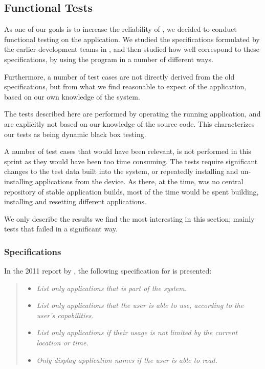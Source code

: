 \subsection{Functional Tests}\label{sec:sprint1:testing}

As one of our goals is to increase the reliability of \launcher, we decided to conduct functional testing on the application.
We studied the specifications formulated by the earlier development teams in \citet{launcher2011,launcher2012}, and then studied how well \launcher correspond to these specifications, by using the program in a number of different ways. 

Furthermore, a number of test cases are not directly derived from the old specifications, but from what we find reasonable to expect of the application, based on our own knowledge of the system.

The tests described here are performed by operating the running application, and are explicitly not based on our knowledge of the source code. 
This characterizes our tests as being dynamic black box testing. 

A number of test cases that would have been relevant, is not performed in this sprint as they would have been too time consuming. 
The tests require significant changes to the test data built into the \giraf system, or repeatedly installing and un-installing applications from the device.
As there, at the time, was no central repository of stable application builds, most of the time would be spent building, installing and resetting different applications.

We only describe the results we find the most interesting in this section; mainly tests that failed in a significant way.

\subsubsection{Specifications}
In the 2011 report by \citet{launcher2011}, the following specification for \launcher is presented:

\begin{quote}
\begin{itemize}
	\item \textit{List only applications that is part of the \giraf system.}
	\item \textit{List only applications that the user is able to use, according to the user's capabilities.}
	\item \textit{List only applications if their usage is not limited by the current location or time.}
	\item \textit{Only display application names if the user is able to read.}
\end{itemize}
\end{quote}

